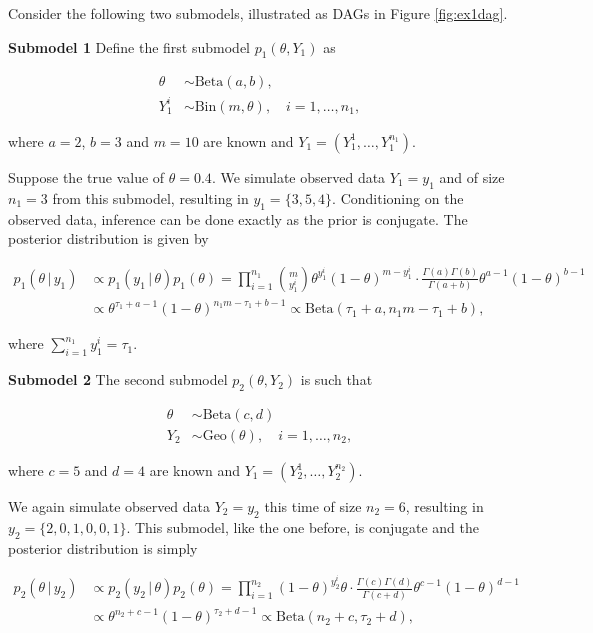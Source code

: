 \documentclass[11pt,]{book}
\begin{document}
Consider the following two submodels, illustrated as DAGs in Figure
\ref{fig:ex1dag}.

\textbf{Submodel 1} Define the first submodel \(p_1(\theta, Y_1)\) as

\begin{align}
\theta &\sim \text{Beta}(a, b), \label{eq:prior1} \\
Y_1^i &\sim \text{Bin}(m, \theta), \quad i = 1, \ldots, n_1,
\end{align}

where \(a = 2\), \(b = 3\) and \(m = 10\) are known and
\(Y_1 = (Y_1^1, \ldots, Y_1^{n_1})\).

Suppose the true value of \(\theta = 0.4\). We simulate observed data
\(Y_1 = y_1\) and of size \(n_1 = 3\) from this submodel, resulting in
\(y_1 = \{3, 5, 4\}\). Conditioning on the observed data, inference can
be done exactly as the prior is conjugate. The posterior distribution is
given by

\begin{align}
p_1(\theta \, | \, y_1) &\propto p_1(y_1 \, | \, \theta) p_1(\theta) 
= \prod_{i=1}^{n_1} {m\choose y_1^i} \theta^{y_1^i}  (1- \theta)^{m-{y_1^i}} \cdot 
   \frac{\Gamma(a)\Gamma(b)}{\Gamma(a+b)} \theta^{a-1} (1- \theta)^{b-1} \nonumber \\
&\propto \theta^{\tau_1 + a - 1}  (1- \theta)^{n_1m-\tau_1 + b - 1} 
\propto \text{Beta}(\tau_1 + a, n_1m-\tau_1 + b),
\end{align}

where \(\sum_{i=1}^{n_1} y_1^i = \tau_1\).

\textbf{Submodel 2} The second submodel \(p_2(\theta, Y_2)\) is such
that

\begin{align}
\theta &\sim \text{Beta}(c, d) \label{eq:prior2} \\
Y_2 &\sim \text{Geo}(\theta), \quad i = 1, \ldots, n_2,
\end{align}

where \(c = 5\) and \(d = 4\) are known and
\(Y_1 = (Y_2^1, \ldots, Y_2^{n_2})\).

We again simulate observed data \(Y_2 = y_2\) this time of size
\(n_2 = 6\), resulting in \(y_2 = \{2, 0, 1, 0, 0, 1\}\). This submodel,
like the one before, is conjugate and the posterior distribution is
simply

\begin{align}
p_2(\theta \, | \, y_2) &\propto p_2(y_2 \, | \, \theta) p_2(\theta)
= \prod_{i=1}^{n_2} (1-\theta)^{y_2^i} \theta \cdot 
   \frac{\Gamma(c)\Gamma(d)}{\Gamma(c+d)} \theta^{c-1} (1- \theta)^{d-1} \nonumber \\
&\propto \theta^{n_2 + c - 1}  (1- \theta)^{\tau_2 + d - 1}
\propto \text{Beta}(n_2 + c, \tau_2 + d),
\end{align}
\end{document}
